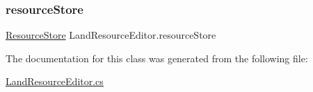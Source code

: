 \subsubsection{\texorpdfstring{resource\+Store}{resourceStore}}
{\footnotesize\ttfamily \mbox{\hyperlink{class_resource_store}{Resource\+Store}} Land\+Resource\+Editor.\+resource\+Store}



The documentation for this class was generated from the following file\+:\begin{DoxyCompactItemize}
\item 
\mbox{\hyperlink{_land_resource_editor_8cs}{Land\+Resource\+Editor.\+cs}}\end{DoxyCompactItemize}
